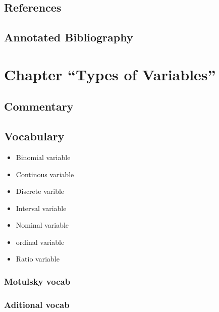 \documentclass[]{book}
\providecommand{\tightlist}{%
  \setlength{\itemsep}{0pt}\setlength{\parskip}{0pt}}
\theoremstyle{definition}
\theoremstyle{definition}
\theoremstyle{definition}
\theoremstyle{remark}
\begin{document}
\section*{References}\label{references-2}

\section*{Annotated Bibliography}\label{annotated-bibliography-2}

\chapter{\texorpdfstring{Chapter ``Types of
Variables''}{Chapter Types of Variables}}\label{chapter-types-of-variables}

\section*{Commentary}\label{commentary-3}

\section*{Vocabulary}\label{vocabulary-4}

\begin{itemize}
\tightlist
\item
  Binomial variable
\item
  Continous variable
\item
  Discrete varible
\item
  Interval variable
\item
  Nominal variable
\item
  ordinal variable
\item
  Ratio variable
\end{itemize}

\subsection{Motulsky vocab}\label{motulsky-vocab-4}

\subsection{Aditional vocab}\label{aditional-vocab-1}
\end{document}

